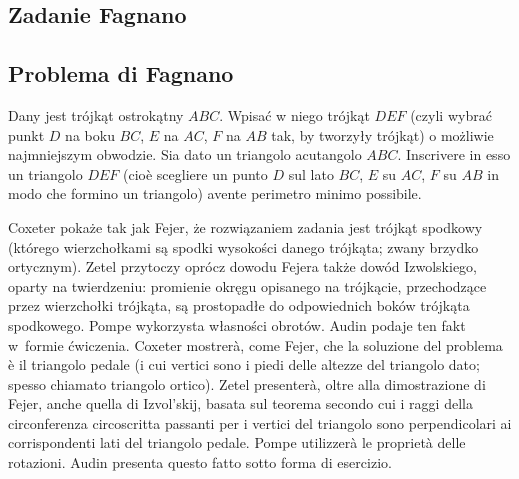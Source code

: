 
%


\subsection{Zadanie Fagnano} %
\subsection{Problema di Fagnano} %

\begin{problem}
[zadanie Fagnano] %
[problema di Fagnano] %
	Dany jest trójkąt ostrokątny $ABC$. %
	Wpisać w niego trójkąt $DEF$ (czyli wybrać punkt $D$ na boku $BC$, $E$ na $AC$, $F$ na $AB$ tak, by tworzyły trójkąt) o możliwie najmniejszym obwodzie. %
	Sia dato un triangolo acutangolo $ABC$. %
	Inscrivere in esso un triangolo $DEF$ (cioè scegliere un punto $D$ sul lato $BC$, $E$ su $AC$, $F$ su $AB$ in modo che formino un triangolo) avente perimetro minimo possibile. %
%
\end{problem}

Coxeter \cite[s. 36, 37]{coxeter_1967} pokaże tak jak Fejer, że rozwiązaniem zadania jest trójkąt spodkowy (którego wierzchołkami są spodki wysokości danego trójkąta; zwany brzydko ortycznym). %
Zetel \cite[s. 97-100]{zetel_2020} przytoczy oprócz dowodu Fejera także dowód Izwolskiego, oparty na twierdzeniu: promienie okręgu opisanego na trójkącie, przechodzące przez wierzchołki trójkąta, są prostopadłe do odpowiednich boków trójkąta spodkowego. %
Pompe \cite[s. 16-18]{pompe_2022} wykorzysta własności obrotów. %
Audin \cite[s. 101]{audin_2003} podaje ten fakt w~formie ćwiczenia. %
Coxeter \cite[pp.~36--37]{coxeter_1967} mostrerà, come Fejer, che la soluzione del problema è il triangolo pedale (i cui vertici sono i piedi delle altezze del triangolo dato; spesso chiamato triangolo ortico). %
Zetel \cite[pp.~97--100]{zetel_2020} presenterà, oltre alla dimostrazione di Fejer, anche quella di Izvol'skij, basata sul teorema secondo cui i raggi della circonferenza circoscritta passanti per i vertici del triangolo sono perpendicolari ai corrispondenti lati del triangolo pedale. %
Pompe \cite[pp.~16--18]{pompe_2022} utilizzerà le proprietà delle rotazioni. %
Audin \cite[p.~101]{audin_2003} presenta questo fatto sotto forma di esercizio. %

